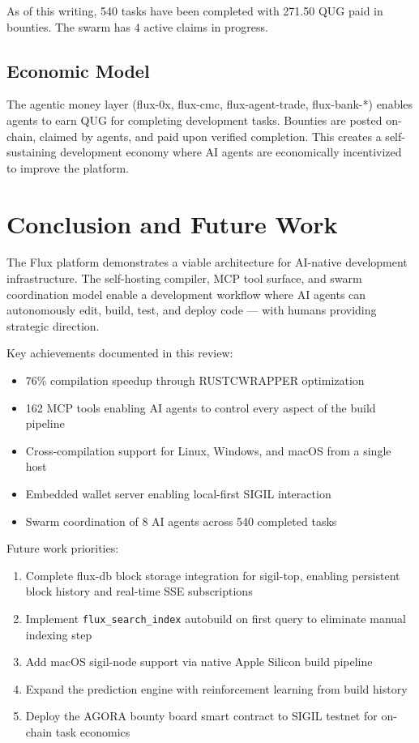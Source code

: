 \documentclass[11pt,a4paper]{article}
\begin{document}
As of this writing, 540 tasks have been completed with 271.50 QUG paid in bounties. The swarm has 4 active claims in progress.

\subsection{Economic Model}

The agentic money layer (flux-0x, flux-cmc, flux-agent-trade, flux-bank-*) enables agents to earn QUG for completing development tasks. Bounties are posted on-chain, claimed by agents, and paid upon verified completion. This creates a self-sustaining development economy where AI agents are economically incentivized to improve the platform.

\section{Conclusion and Future Work}

The Flux platform demonstrates a viable architecture for AI-native development infrastructure. The self-hosting compiler, MCP tool surface, and swarm coordination model enable a development workflow where AI agents can autonomously edit, build, test, and deploy code — with humans providing strategic direction.

Key achievements documented in this review:
\begin{itemize}
\item 76\% compilation speedup through RUSTC\textunderscore WRAPPER optimization
\item 162 MCP tools enabling AI agents to control every aspect of the build pipeline
\item Cross-compilation support for Linux, Windows, and macOS from a single host
\item Embedded wallet server enabling local-first SIGIL interaction
\item Swarm coordination of 8 AI agents across 540 completed tasks
\end{itemize}

Future work priorities:
\begin{enumerate}
\item Complete flux-db block storage integration for sigil-top, enabling persistent block history and real-time SSE subscriptions
\item Implement \texttt{flux\_search\_index} autobuild on first query to eliminate manual indexing step
\item Add macOS sigil-node support via native Apple Silicon build pipeline
\item Expand the prediction engine with reinforcement learning from build history
\item Deploy the AGORA bounty board smart contract to SIGIL testnet for on-chain task economics
\end{enumerate}
\end{document}
